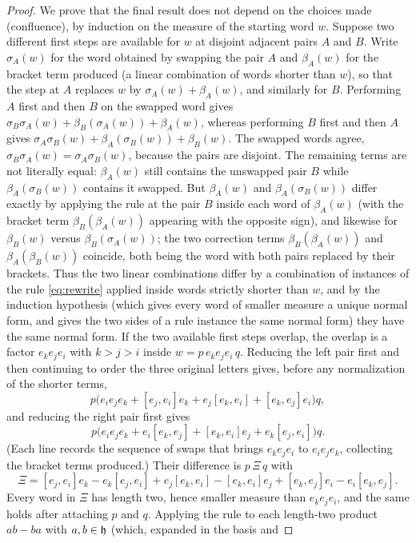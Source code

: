 \begin{proof}
We prove that the final result does not depend on the choices made
(confluence), by induction on the measure of the starting word $w$. Suppose
two different first steps are available for $w$ at disjoint adjacent pairs
$A$ and $B$. Write $\sigma_A(w)$ for the word obtained by swapping the pair
$A$ and $\beta_A(w)$ for the bracket term produced (a linear combination of
words shorter than $w$), so that the step at $A$ replaces $w$ by
$\sigma_A(w)+\beta_A(w)$, and similarly for $B$. Performing $A$ first and
then $B$ on the swapped word gives
$\sigma_B\sigma_A(w)+\beta_B(\sigma_A(w))+\beta_A(w)$, whereas performing
$B$ first and then $A$ gives
$\sigma_A\sigma_B(w)+\beta_A(\sigma_B(w))+\beta_B(w)$. The swapped words
agree, $\sigma_B\sigma_A(w)=\sigma_A\sigma_B(w)$, because the pairs are
disjoint. The remaining terms are not literally equal: $\beta_A(w)$ still
contains the unswapped pair $B$ while $\beta_A(\sigma_B(w))$ contains it
swapped. But $\beta_A(w)$ and $\beta_A(\sigma_B(w))$ differ exactly by
applying the rule at the pair $B$ inside each word of $\beta_A(w)$ (with
the bracket term $\beta_B(\beta_A(w))$ appearing with the opposite sign),
and likewise for $\beta_B(w)$ versus $\beta_B(\sigma_A(w))$; the two
correction terms $\beta_B(\beta_A(w))$ and $\beta_A(\beta_B(w))$ coincide,
both being the word with both pairs replaced by their brackets. Thus the
two linear combinations differ by a combination of instances of the rule
\eqref{eq:rewrite} applied inside words strictly shorter than $w$, and by
the induction hypothesis (which gives every word of smaller measure a
unique normal form, and gives the two sides of a rule instance the same
normal form) they have the same normal form. If the two
available first steps overlap, the overlap is a factor $e_ke_je_i$ with
$k>j>i$ inside $w=p\,e_ke_je_i\,q$. Reducing the left pair first and then
continuing to order the three original letters gives, before any
normalization of the shorter terms,
\[
 p\bigl(e_ie_je_k+[e_j,e_i]e_k+e_j[e_k,e_i]+[e_k,e_j]e_i\bigr)q,
\]
and reducing the right pair first gives
\[
 p\bigl(e_ie_je_k+e_i[e_k,e_j]+[e_k,e_i]e_j+e_k[e_j,e_i]\bigr)q.
\]
(Each line records the sequence of swaps that brings $e_ke_je_i$ to
$e_ie_je_k$, collecting the bracket terms produced.) Their difference is
$p\,\Xi\,q$ with
\[
 \Xi=[e_j,e_i]e_k-e_k[e_j,e_i]+e_j[e_k,e_i]-[e_k,e_i]e_j+[e_k,e_j]e_i-e_i[e_k,e_j].
\]
Every word in $\Xi$ has length two, hence smaller measure than $e_ke_je_i$,
and the same holds after attaching $p$ and $q$. Applying the rule to each
length-two product $ab-ba$ with $a,b\in\mathfrak{h}$ (which, expanded in the basis and

\end{proof}
